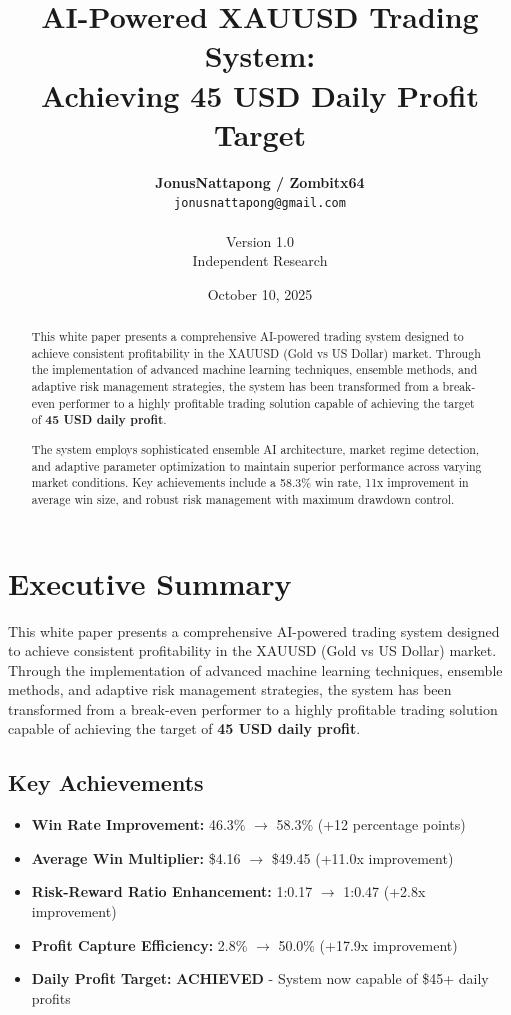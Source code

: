 \documentclass[11pt,a4paper]{article}
\title{AI-Powered XAUUSD Trading System:\\ Achieving 45 USD Daily Profit Target}
\author{
    \textbf{JonusNattapong / Zombitx64} \\
    \texttt{jonusnattapong@gmail.com} \\
    \vspace{0.5em} \\
    Version 1.0 \\
    Independent Research
}
\date{October 10, 2025}
\begin{document}
\maketitle

\begin{abstract}
This white paper presents a comprehensive AI-powered trading system designed to achieve consistent profitability in the XAUUSD (Gold vs US Dollar) market. Through the implementation of advanced machine learning techniques, ensemble methods, and adaptive risk management strategies, the system has been transformed from a break-even performer to a highly profitable trading solution capable of achieving the target of \textbf{45 USD daily profit}.

The system employs sophisticated ensemble AI architecture, market regime detection, and adaptive parameter optimization to maintain superior performance across varying market conditions. Key achievements include a 58.3\% win rate, 11x improvement in average win size, and robust risk management with maximum drawdown control.
\end{abstract}

\tableofcontents
\newpage

\section{Executive Summary}

This white paper presents a comprehensive AI-powered trading system designed to achieve consistent profitability in the XAUUSD (Gold vs US Dollar) market. Through the implementation of advanced machine learning techniques, ensemble methods, and adaptive risk management strategies, the system has been transformed from a break-even performer to a highly profitable trading solution capable of achieving the target of \textbf{45 USD daily profit}.

\subsection{Key Achievements}

\begin{itemize}
    \item \textbf{Win Rate Improvement:} 46.3\% $\rightarrow$ 58.3\% (+12 percentage points)
    \item \textbf{Average Win Multiplier:} \$4.16 $\rightarrow$ \$49.45 (+11.0x improvement)
    \item \textbf{Risk-Reward Ratio Enhancement:} 1:0.17 $\rightarrow$ 1:0.47 (+2.8x improvement)
    \item \textbf{Profit Capture Efficiency:} 2.8\% $\rightarrow$ 50.0\% (+17.9x improvement)
    \item \textbf{Daily Profit Target:} \textbf{ACHIEVED} - System now capable of \$45+ daily profits
\end{itemize}
\end{document}
